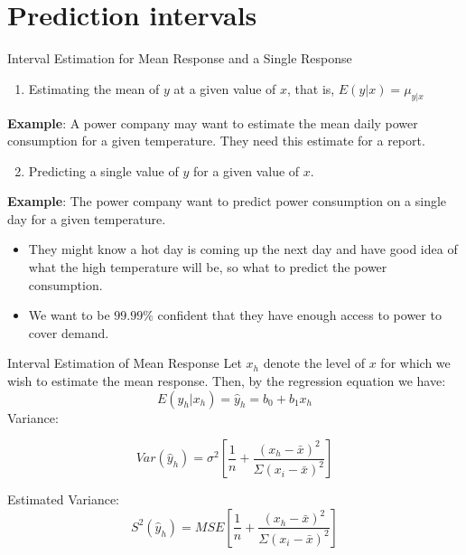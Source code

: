 \documentclass[
  ignorenonframetext,
]{beamer}
\providecommand{\tightlist}{%
  \setlength{\itemsep}{0pt}\setlength{\parskip}{0pt}}
\begin{document}
\hypertarget{prediction-intervals}{%
\section{Prediction intervals}\label{prediction-intervals}}

\begin{frame}{Interval Estimation for Mean Response and a Single
Response}
\protect\hypertarget{interval-estimation-for-mean-response-and-a-single-response}{}
\begin{enumerate}
\tightlist
\item
  Estimating the mean of \(y\) at a given value of \(x\), that is,
  \(E(y|x)=\mu_{y|x}\)
\end{enumerate}

\textbf{Example}: A power company may want to estimate the mean daily
power consumption for a given temperature. They need this estimate for a
report.

\begin{enumerate}
\setcounter{enumi}{1}
\tightlist
\item
  Predicting a single value of \(y\) for a given value of \(x\).
\end{enumerate}

\textbf{Example}: The power company want to predict power consumption on
a single day for a given temperature.

\begin{itemize}
\item
  They might know a hot day is coming up the next day and have good idea
  of what the high temperature will be, so what to predict the power
  consumption.
\item
  We want to be \(99.99\%\) confident that they have enough access to
  power to cover demand.
\end{itemize}
\end{frame}

\begin{frame}{Interval Estimation of Mean Response}
\protect\hypertarget{interval-estimation-of-mean-response}{}
Let \(x_h\) denote the level of \(x\) for which we wish to estimate the
mean response. Then, by the regression equation we have:
\[E(y_h|x_h)=\hat{y}_h=b_0+b_1x_h\] Variance:

\[Var(\hat{y}_h)=\sigma^2\left[\frac{1}{n}+\frac{(x_h-\bar{x})^2}{\Sigma(x_i-\bar{x})^2}\right]\]

Estimated Variance:
\[S^2(\hat{y}_h)=MSE\left[\frac{1}{n}+\frac{(x_h-\bar{x})^2}{\Sigma(x_i-\bar{x})^2}\right]\]
\end{frame}
\end{document}
